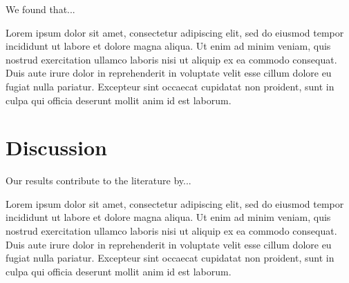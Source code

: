 \documentclass[jou, floatsintext, colorlinks=true, linkcolor=blue, citecolor=blue, urlcolor=blue]{apa7} %
\begin{document}
We found that...

Lorem ipsum dolor sit amet, consectetur adipiscing elit, sed do eiusmod tempor incididunt ut labore et dolore magna aliqua. Ut enim ad minim veniam, quis nostrud exercitation ullamco laboris nisi ut aliquip ex ea commodo consequat. Duis aute irure dolor in reprehenderit in voluptate velit esse cillum dolore eu fugiat nulla pariatur. Excepteur sint occaecat cupidatat non proident, sunt in culpa qui officia deserunt mollit anim id est laborum.

\section{Discussion}

Our results contribute to the literature by...

Lorem ipsum dolor sit amet, consectetur adipiscing elit, sed do eiusmod tempor incididunt ut labore et dolore magna aliqua. Ut enim ad minim veniam, quis nostrud exercitation ullamco laboris nisi ut aliquip ex ea commodo consequat. Duis aute irure dolor in reprehenderit in voluptate velit esse cillum dolore eu fugiat nulla pariatur. Excepteur sint occaecat cupidatat non proident, sunt in culpa qui officia deserunt mollit anim id est laborum.

\printbibliography %
\end{document}
